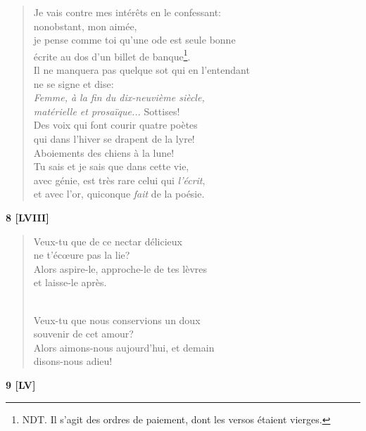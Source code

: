 \documentclass[a4paper,12pt]{book}
\begin{document}
\begin{verse}
Je vais contre mes intérêts en le confessant: \\
nonobstant, mon aimée, \\
je pense comme toi qu'une ode est seule bonne \\
écrite au dos d'un billet de banque\footnote{NDT. Il s'agit des ordres de paiement, dont les versos étaient vierges.}. \\
Il ne manquera pas quelque sot qui en l'entendant \\
ne se signe et dise: \\
{\em Femme, à la fin du dix-neuvième siècle, \\
matérielle et prosaïque...} Sottises! \\
Des voix qui font courir quatre poètes \\
qui dans l'hiver se drapent de la lyre! \\
Aboiements des chiens à la lune! \\
Tu sais et je sais que dans cette vie, \\
avec génie, est très rare celui qui {\em l'écrit}, \\
et avec l'or, quiconque {\em fait} de la poésie. \\
\end{verse}

\bigskip

\begin{center} {\bf 8 [LVIII]} \end{center}

\begin{verse}
Veux-tu que de ce nectar délicieux \\
ne t'éc{\oe}ure pas la lie? \\
Alors aspire-le, approche-le de tes lèvres \\
et laisse-le après. \\ \

Veux-tu que nous conservions un doux \\
souvenir de cet amour? \\
Alors aimons-nous aujourd'hui, et demain \\
disons-nous adieu! \\
\end{verse}

\bigskip

\begin{center} {\bf 9 [LV]} \end{center}
\end{document}
